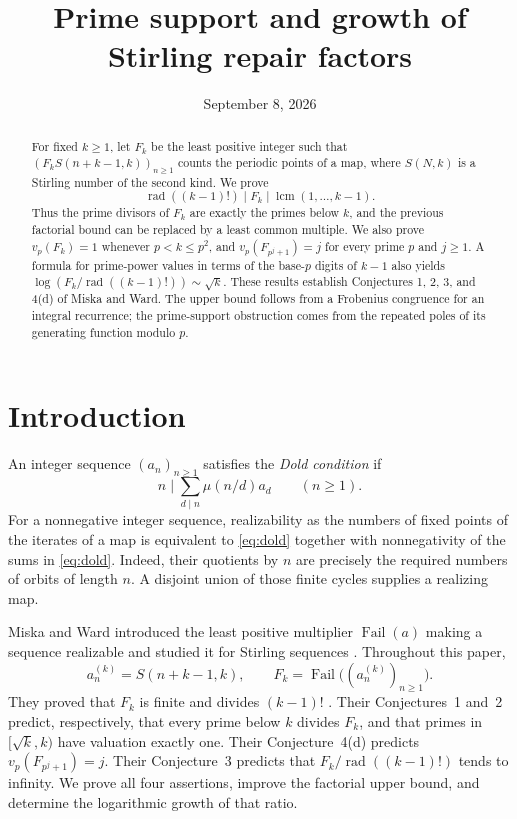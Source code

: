 \documentclass[11pt]{article}
\title{Prime support and growth of Stirling repair factors}
\author{}
\date{September 8, 2026}
\theoremstyle{remark}
\DeclareMathOperator{\Fail}{Fail}
\DeclareMathOperator{\rad}{rad}
\DeclareMathOperator{\lcm}{lcm}
\begin{document}
\maketitle
\begin{abstract}
For fixed $k\geq1$, let $F_k$ be the least positive integer such that
$(F_k S(n+k-1,k))_{n\geq1}$ counts the periodic points of a map, where $S(N,k)$
is a Stirling number of the second kind. We prove
\[
 \rad((k-1)!)\mid F_k\mid\lcm(1,\ldots,k-1).
\]
Thus the prime divisors of $F_k$ are exactly the primes below $k$, and the
previous factorial bound can be replaced by a least common multiple.
We also prove $v_p(F_k)=1$ whenever $p<k\leq p^2$, and
$v_p(F_{p^j+1})=j$ for every prime $p$ and $j\geq1$.
A formula for prime-power values in terms of the base-$p$ digits of $k-1$
also yields
$\log(F_k/\rad((k-1)!))\sim\sqrt{k}$.
These results establish Conjectures 1, 2, 3, and 4(d) of Miska and Ward.
The upper bound follows from a Frobenius congruence for an integral recurrence;
the prime-support obstruction comes from the repeated poles of its generating
function modulo $p$.
\end{abstract}

\section{Introduction}
An integer sequence $(a_n)_{n\geq1}$ satisfies the \emph{Dold condition} if
\begin{equation}\label{eq:dold}
 n\mid\sum_{d\mid n}\mu(n/d)a_d\qquad(n\geq1).
\end{equation}
For a nonnegative integer sequence, realizability as the numbers of fixed
points of the iterates of a map is equivalent to \eqref{eq:dold} together with
nonnegativity of the sums in \eqref{eq:dold}. Indeed, their quotients by $n$
are precisely the required numbers of orbits of length $n$. A disjoint union
of those finite cycles supplies a realizing map.

Miska and Ward introduced the least positive multiplier $\Fail(a)$ making a
sequence realizable and studied it for Stirling sequences
\cite{MW}. Throughout this paper,
\[
 a_n^{(k)}=S(n+k-1,k),\qquad
 F_k=\Fail\bigl((a_n^{(k)})_{n\geq1}\bigr).
\]
They proved that $F_k$ is finite and divides $(k-1)!$
\cite[Theorem~7]{MW}. Their Conjectures~1 and~2 predict, respectively, that
every prime below $k$ divides $F_k$, and that primes in
$[\sqrt{k},k)$ have valuation exactly one. Their Conjecture~4(d) predicts
$v_p(F_{p^j+1})=j$. Their Conjecture~3 predicts that
$F_k/\rad((k-1)!)$ tends to infinity. We prove all four assertions, improve
the factorial upper bound, and determine the logarithmic growth of that ratio.
\end{document}
